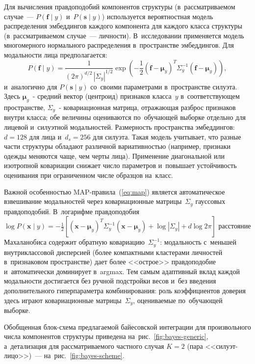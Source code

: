 Для вычисления правдоподобий компонентов структуры (в~рассматриваемом
случае~--- $P(\mathbf{f}\mid y)$ и~$P(\mathbf{s}\mid y)$) используется
вероятностная модель распределения эмбеддингов каждого компонента для каждого
класса структуры (в~рассматриваемом случае~--- личности). В~исследовании применяется модель многомерного нормального
распределения в~пространстве эмбеддингов. Для модальности лица
предполагается:
\begin{equation}
    P(\mathbf{f}\mid y)=
    \frac{1}{(2\pi)^{d/2}\,|\Sigma_y|^{1/2}}
    \exp\!\left(-\frac{1}{2}(\mathbf{f}-\boldsymbol{\mu}_y)^T
    \Sigma_y^{-1}(\mathbf{f}-\boldsymbol{\mu}_y)\right),
    \label{eq:gauss}
\end{equation}
и~аналогично для $P(\mathbf{s}\mid y)$ со~своими параметрами в~пространстве
силуэта. Здесь $\boldsymbol{\mu}_y$~- средний вектор (центроид) признаков
класса~$y$ в~соответствующем пространстве, $\Sigma_y$~- ковариационная
матрица, отражающая разброс признаков внутри класса; обе величины
оцениваются по~обучающей выборке отдельно для лицевой и~силуэтной
модальностей. Размерность пространства эмбеддингов: $d=128$ для лица
и~$d_s=256$ для силуэта. Такая модель учитывает,
что разные части структуры обладают различной вариативностью (например,
признаки одежды меняются чаще, чем черты лица). Применение диагональной
или изотропной ковариации снижает число параметров и~повышает
устойчивость оценивания при ограниченном числе образцов на~класс.

Важной особенностью MAP-правила~(\ref{eq:map}) является автоматическое
взвешивание модальностей через ковариационные матрицы~$\Sigma_y$ гауссовых
правдоподобий. В~логарифме правдоподобия
$\log P(\mathbf{x}\mid y) = -\tfrac{1}{2}\!\left[(\mathbf{x}-\boldsymbol{\mu}_y)^{T}\Sigma_y^{-1}(\mathbf{x}-\boldsymbol{\mu}_y)+\log|\Sigma_y|+d\log 2\pi\right]$
расстояние Махаланобиса содержит обратную ковариацию~$\Sigma_y^{-1}$:
модальность с~меньшей внутриклассовой дисперсией (более компактными
кластерами личностей в~признаковом пространстве) дает более <<острое>>
правдоподобие и~автоматически доминирует в~argmax. Тем самым адаптивный
вклад каждой модальности достигается без ручной подстройки весов
и~без введения дополнительного гиперпараметра комбинирования: роль
коэффициентов доверия здесь играют ковариационные матрицы~$\Sigma_y$,
оцениваемые по~обучающей выборке.

Обобщенная блок-схема предлагаемой байесовской интеграции для
произвольного числа компонентов структуры приведена
на~рис.~\ref{fig:bayes-generic}, а~детализация для рассматриваемого
частного случая $K=2$ (пара <<силуэт-лицо>>)~---
на~рис.~\ref{fig:bayes-scheme}.

